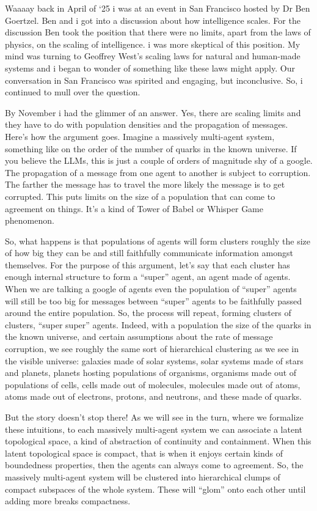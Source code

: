 Waaaay back in April of `25 i was at an event in San Francisco hosted by Dr Ben Goertzel. Ben and i got into a discussion about how intelligence scales. For the discussion Ben took the position that there were no limits, apart from the laws of physics, on the scaling of intelligence. i was more skeptical of this position. My mind was turning to Geoffrey West's scaling laws for natural and human-made systems and i began to wonder of something like these laws might apply. Our conversation in San Francisco was spirited and engaging, but inconclusive. So, i continued to mull over the question. 

By November i had the glimmer of an answer. Yes, there are scaling limits and they have to do with population densities and the propagation of messages. Here's how the argument goes. Imagine a massively multi-agent system, something like on the order of the number of quarks in the known universe. If you believe the LLMs, this is just a couple of orders of magnitude shy of a google. The propagation of a message from one agent to another is subject to corruption. The farther the message has to travel the more likely the message is to get corrupted. This puts limits on the size of a population that can come to agreement on things. It's a kind of Tower of Babel or Whisper Game phenomenon.

So, what happens is that populations of agents will form clusters roughly the size of how big they can be and still faithfully communicate information amongst themselves. For the purpose of this argument, let's say that each cluster has enough internal structure to form a ``super'' agent, an agent made of agents. When we are talking a google of agents even the population of ``super'' agents will still be too big for messages between ``super'' agents to be faithfully passed around the entire population. So, the process will repeat, forming clusters of clusters, ``super super'' agents. Indeed, with a population the size of the quarks in the known universe, and certain assumptions about the rate of message corruption, we see roughly the same sort of hierarchical clustering as we see in the visible universe: galaxies made of solar systems, solar systems made of stars and planets, planets hosting populations of organisms, organisms made out of populations of cells, cells made out of molecules, molecules made out of atoms, atoms made out of electrons, protons, and neutrons, and these made of quarks. 

But the story doesn't stop there! As we will see in the turn, where we formalize these intuitions, to each massively multi-agent system we can associate a latent topological space, a kind of abstraction of continuity and containment. When this latent topological space is compact, that is when it enjoys certain kinds of boundedness properties, then the agents can always come to agreement. So, the massively multi-agent system will be clustered into hierarchical clumps of compact subspaces of the whole system. These will ``glom'' onto each other until adding more breaks compactness.

